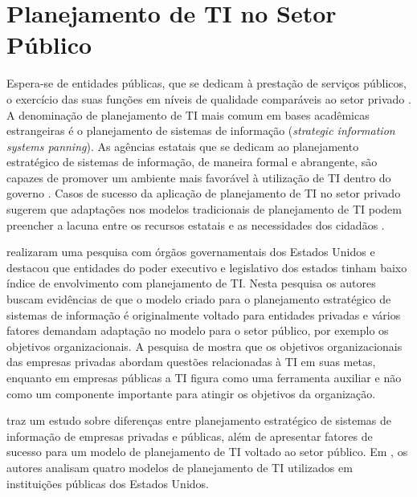 \section{Planejamento de TI no Setor Público}


Espera-se de entidades públicas, que se dedicam à prestação de serviços públicos, o exercício das suas funções em níveis de qualidade comparáveis ao setor privado \cite{nezakati:14}. A denominação de planejamento de TI mais comum em bases acadêmicas estrangeiras é o planejamento de sistemas de informação (\textit{strategic information systems panning}). As agências estatais que se dedicam ao planejamento estratégico de sistemas de informação, de maneira formal e abrangente, são capazes de promover um ambiente mais favorável à utilização de TI dentro do governo \cite{bajjaly:98}. Casos de sucesso da aplicação de planejamento de TI no setor privado sugerem que adaptações nos modelos tradicionais de planejamento de TI podem preencher a lacuna entre os recursos estatais e as necessidades dos cidadãos \cite{dufner:02}.

 realizaram uma pesquisa com órgãos governamentais dos Estados Unidos e destacou que entidades do poder executivo e legislativo dos estados tinham baixo índice de envolvimento com planejamento de TI. Nesta pesquisa os autores buscam evidências de que o modelo criado para o planejamento estratégico de sistemas de informação é originalmente voltado para entidades privadas e vários fatores demandam adaptação no modelo para o setor público, por exemplo os objetivos organizacionais. A pesquisa de  mostra que os objetivos organizacionais das empresas privadas abordam questões relacionadas à TI em suas metas, enquanto em empresas públicas a TI figura como uma ferramenta auxiliar e não como um componente importante para atingir os objetivos da organização. 

 traz um estudo sobre diferenças entre planejamento estratégico de sistemas de informação de empresas privadas e públicas, além de apresentar fatores de sucesso para um modelo de planejamento de TI voltado ao setor público. Em , os autores analisam quatro modelos de planejamento de TI utilizados em instituições públicas dos Estados Unidos. 

